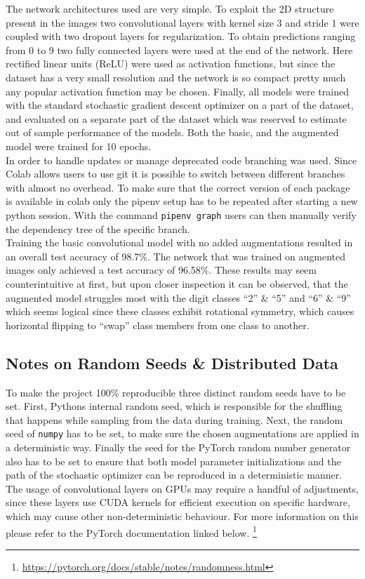 \documentclass{article}
\begin{document}
The network architectures used are very simple. To exploit the 2D structure present in the images two convolutional layers with kernel size 3 and stride 1 were coupled with two dropout layers for regularization. To obtain predictions ranging from 0 to 9 two fully connected layers were used at the end of the network. Here rectified linear units (ReLU) were used as activation functions, but since the dataset has a very small resolution and the network is so compact pretty much any popular activation function may be chosen. Finally, all models were trained with the standard stochastic gradient descent optimizer on a part of the dataset, and evaluated on a separate part of the dataset which was reserved to estimate out of sample performance of the models. Both the basic, and the augmented model were trained for 10 epochs.\\
In order to handle updates or manage deprecated code branching was used. Since Colab allows users to use git it is possible to switch between different branches with almost no overhead. To make sure that the correct version of each package is available in colab only the pipenv setup has to be repeated after starting a new python session. With the command \texttt{pipenv graph} users can then manually verify the dependency tree of the specific branch. \\
Training the basic convolutional model with no added augmentations resulted in an overall test accuracy of 98.7\%. The network that was trained on augmented images only achieved a test accuracy of 96.58\%. These results may seem counterintuitive at first, but upon closer inspection it can be observed, that the augmented model struggles most with the digit classes ``2'' \& ``5'' and ``6'' \& ``9'' which seems logical since these classes exhibit rotational symmetry, which causes horizontal flipping to ``swap'' class members from one class to another.

\subsection{Notes on Random Seeds \& Distributed Data}
To make the project 100\% reproducible three distinct random seeds have to be set. First, Pythons internal random seed, which is responsible for the shuffling that happens while sampling from the data during training. Next, the random seed of \texttt{numpy} has to be set, to make sure the chosen augmentations are applied in a deterministic way. Finally the seed for the PyTorch random number generator also has to be set to ensure that both model parameter initializations and the path of the stochastic optimizer can be reproduced in a deterministic manner. \\
The usage of convolutional layers on GPUs may require a handful of adjustments, since these layers use CUDA kernels for efficient execution on specific hardware, which may cause other non-deterministic behaviour. For more information on this please refer to the PyTorch documentation linked below. \footnote{\url{https://pytorch.org/docs/stable/notes/randomness.html}}
\end{document}

